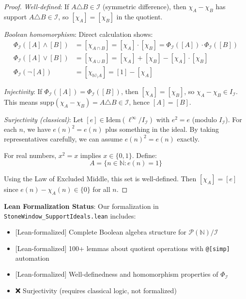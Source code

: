 \documentclass[11pt]{article}
\theoremstyle{plain}
\theoremstyle{definition}
\newcommand{\N}{\mathbb{N}}
\newcommand{\linf}{\ell^\infty}
\newcommand{\leanok}{\textsf{\textcolor{green!70!black}{[Lean-formalized]}}}
\begin{document}
\begin{proof}
\emph{Well-defined}: If $A \triangle B \in \mathcal{I}$ (symmetric difference), then $\chi_A - \chi_B$ has support $A \triangle B \in \mathcal{I}$, so $[\chi_A] = [\chi_B]$ in the quotient.

\emph{Boolean homomorphism}: Direct calculation shows:
\begin{align}
\Phi_{\mathcal{I}}([A] \wedge [B]) &= [\chi_{A \cap B}] = [\chi_A] \cdot [\chi_B] = \Phi_{\mathcal{I}}([A]) \cdot \Phi_{\mathcal{I}}([B])\\
\Phi_{\mathcal{I}}([A] \vee [B]) &= [\chi_{A \cup B}] = [\chi_A] + [\chi_B] - [\chi_A] \cdot [\chi_B]\\
\Phi_{\mathcal{I}}(\neg[A]) &= [\chi_{\N \setminus A}] = [1] - [\chi_A]
\end{align}

\emph{Injectivity}: If $\Phi_{\mathcal{I}}([A]) = \Phi_{\mathcal{I}}([B])$, then $[\chi_A] = [\chi_B]$, so $\chi_A - \chi_B \in I_{\mathcal{I}}$. This means $\text{supp}(\chi_A - \chi_B) = A \triangle B \in \mathcal{I}$, hence $[A] = [B]$.

\emph{Surjectivity (classical)}: Let $[e] \in \text{Idem}(\linf/I_{\mathcal{I}})$ with $e^2 = e$ (modulo $I_{\mathcal{I}}$). For each $n$, we have $e(n)^2 = e(n)$ plus something in the ideal. By taking representatives carefully, we can assume $e(n)^2 = e(n)$ exactly.

For real numbers, $x^2 = x$ implies $x \in \{0, 1\}$. Define:
\[
A = \{n \in \N : e(n) = 1\}
\]

Using the Law of Excluded Middle, this set is well-defined. Then $[\chi_A] = [e]$ since $e(n) - \chi_A(n) \in \{0\}$ for all $n$.
\end{proof}

\begin{formalbox}
\textbf{Lean Formalization Status}: Our formalization in \texttt{StoneWindow\_SupportIdeals.lean} includes:
\begin{itemize}
\item \leanok{} Complete Boolean algebra structure for $\mathcal{P}(\N)/\mathcal{I}$
\item \leanok{} 100+ lemmas about quotient operations with \texttt{@[simp]} automation
\item \leanok{} Well-definedness and homomorphism properties of $\Phi_{\mathcal{I}}$
\item ❌ Surjectivity (requires classical logic, not formalized)
\end{itemize}
\end{formalbox}
\end{document}
